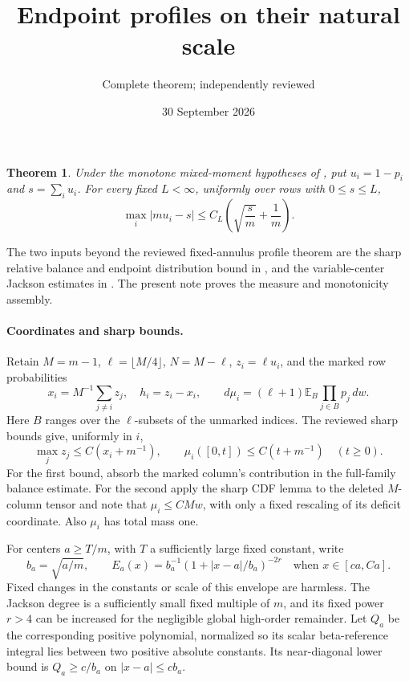 \documentclass[11pt]{article}
\title{Endpoint profiles on their natural scale}
\author{Complete theorem; independently reviewed}
\date{30 September 2026}
\newtheorem{theorem}{Theorem}\newtheorem{lemma}{Lemma}
\newcommand{\E}{\mathbb E}
\begin{document}
\maketitle

\begin{theorem}\label{main}
Under the monotone mixed-moment hypotheses of
, put
$u_i=1-p_i$ and $s=\sum_i u_i$. For every fixed $L<\infty$,
uniformly over rows with $0\le s\le L$,
\[
 \max_i|m u_i-s|\le C_L\left(\sqrt{\frac{s}{m}}+\frac1m\right).
\]
\end{theorem}

The two inputs beyond the reviewed fixed-annulus profile theorem are
the sharp relative balance and endpoint distribution bound in
, and the variable-center
Jackson estimates in
.
The present note proves the measure and monotonicity assembly.

\paragraph{Coordinates and sharp bounds.}
Retain $M=m-1$, $\ell=\lfloor M/4\rfloor$, $N=M-\ell$,
$z_i=\ell u_i$, and the marked row probabilities
\[
 x_i=M^{-1}\sum_{j\ne i}z_j,\quad h_i=z_i-x_i,\qquad
 d\mu_i=(\ell+1)\E_B\prod_{j\in B}p_j\,dw.
\]
Here $B$ ranges over the $\ell$-subsets of the unmarked indices.
The reviewed sharp bounds give, uniformly in $i$,
\begin{equation}\label{sharp}
 \max_j z_j\le C(x_i+m^{-1}),\qquad
 \mu_i([0,t])\le C(t+m^{-1})\quad(t\ge0).
\end{equation}
For the first bound, absorb the marked column's contribution in
the full-family balance estimate. For the second apply the sharp
CDF lemma to the deleted $M$-column tensor and note that
$\mu_i\le C M w$, with only a fixed rescaling of its deficit
coordinate. Also $\mu_i$ has total mass one.

For centers $a\ge T/m$, with $T$ a sufficiently large fixed constant,
write
\[
 b_a=\sqrt{a/m},\qquad
 E_a(x)=b_a^{-1}(1+|x-a|/b_a)^{-2r}
 \quad\text{when }x\in[c a,Ca].
\]
Fixed changes in the constants or scale of this envelope are harmless.
The Jackson degree is a sufficiently small fixed multiple of $m$,
and its fixed power $r>4$ can be increased for the negligible global
high-order remainder. Let $Q_a$ be the corresponding positive
polynomial, normalized so its scalar beta-reference integral lies
between two positive absolute constants. Its near-diagonal lower
bound is $Q_a\ge c/b_a$ on $|x-a|\le c b_a$.
\end{document}
